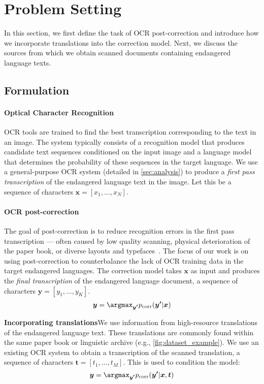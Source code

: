 \section{Problem Setting}
\label{sec:setting}
In this section, we first define the task of OCR post-correction and introduce how we incorporate translations into the correction model. Next, we discuss the sources from which we obtain scanned documents containing endangered language texts.

\subsection{Formulation}
\label{sec:formulation}
\paragraph{Optical Character Recognition} OCR tools are trained to find the best transcription corresponding to the text in an image. The system typically consists of a recognition model that produces candidate text sequences conditioned on the input image and a language model that determines the probability of these sequences in the target language. We use a general-purpose OCR system (detailed in \autoref{sec:analysis}) to produce a \emph{first pass transcription} of the endangered language text in the image. Let this be a sequence of characters $\boldsymbol{x} = [x_1, \dots, x_N]$.

\paragraph{OCR post-correction} The goal of post-correction is to reduce recognition errors in the first pass transcription --- often caused by low quality scanning, physical deterioration of the paper book, or diverse layouts and typefaces~\cite{dong-smith-2018-multi}. The focus of our work is on using post-correction to counterbalance the lack of OCR training data in the target endangered languages. The correction model takes $\boldsymbol{x}$ as input and produces the \emph{final transcription} of the endangered language document, a sequence of characters $\boldsymbol{y} = [y_1, \dots , y_K]$. 
$$\boldsymbol{y} = \argmax_{\boldsymbol{y'}} p_\text{corr}(\boldsymbol{y'}|\boldsymbol{x})$$

\noindent
\textbf{Incorporating translations}\quad We use information from high-resource translations of the endangered language text. These translations are commonly found within the same paper book or linguistic archive (e.g., \autoref{fig:dataset_example}). We use an existing OCR system to obtain a transcription of the scanned translation, a sequence of characters $\boldsymbol{t} = [t_1, \dots, t_M]$. This is used to condition the model:
$$\boldsymbol{y} = \argmax_{\boldsymbol{y'}} p_\text{corr}(\boldsymbol{y'}|\boldsymbol{x}, \boldsymbol{t})$$


